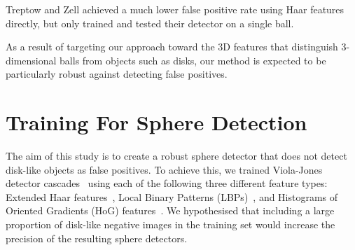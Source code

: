 \documentclass{sig-alternate-05-2015}
\newcommand{\citep}[1]{\cite{#1}}
\newcommand{\citet}[1]{\cite{#1}}
\begin{document}
{		Treptow and Zell \citet{treptow2004filter} achieved a much lower false positive rate using Haar features directly, but only trained and tested their detector on a single ball.

		As a result of targeting our approach toward the 3D features that distinguish 3-dimensional balls from objects such as disks, our method is expected to be particularly robust against detecting false positives.

	}

	\section{Training For Sphere Detection} {

		The aim of this study is to create a robust sphere detector that does not detect disk-like objects as false positives. To achieve this, we trained Viola-Jones detector cascades~\citep{viola2001rapid} using each of the following three different feature types: Extended Haar features~\citep{Lienhart2002extended}, Local Binary Patterns (LBPs)~\citep{liao2007learning}, and Histograms of Oriented Gradients (HoG) features~\citep{dalal2005histograms}. We hypothesised that including a large proportion of disk-like negative images in the training set would increase the precision of the resulting sphere detectors.



	}
\end{document}
